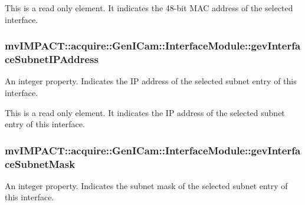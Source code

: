 This is a read only element. It indicates the 48-\/bit M\+A\+C address of the selected interface. \hypertarget{classmv_i_m_p_a_c_t_1_1acquire_1_1_gen_i_cam_1_1_interface_module_a147edfbcbef7561103894d3c5e9c080a}{
\subsubsection[{gev\+Interface\+Subnet\+I\+P\+Address}]{ mv\+I\+M\+P\+A\+C\+T\+::acquire\+::\+Gen\+I\+Cam\+::\+Interface\+Module\+::gev\+Interface\+Subnet\+I\+P\+Address}}\label{classmv_i_m_p_a_c_t_1_1acquire_1_1_gen_i_cam_1_1_interface_module_a147edfbcbef7561103894d3c5e9c080a}


An integer property. Indicates the I\+P address of the selected subnet entry of this interface. 

This is a read only element. It indicates the I\+P address of the selected subnet entry of this interface. \hypertarget{classmv_i_m_p_a_c_t_1_1acquire_1_1_gen_i_cam_1_1_interface_module_aa8456ede212088d460ea5c2b90242f1b}{
\subsubsection[{gev\+Interface\+Subnet\+Mask}]{ mv\+I\+M\+P\+A\+C\+T\+::acquire\+::\+Gen\+I\+Cam\+::\+Interface\+Module\+::gev\+Interface\+Subnet\+Mask}}\label{classmv_i_m_p_a_c_t_1_1acquire_1_1_gen_i_cam_1_1_interface_module_aa8456ede212088d460ea5c2b90242f1b}


An integer property. Indicates the subnet mask of the selected subnet entry of this interface. 

